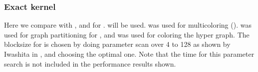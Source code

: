 

\subsubsection{Exact kernel}
Here we compare  \RACE with \ABMC, \MC and \MKL for \SymmSpmv.  will be used. \COLPACK \cite{COLPACK} %
was used for multicoloring (\MC). \METIS \cite{METIS}  was used for graph partitioning for \ABMC, and \COLPACK was used for coloring the hyper graph. The blocksize for \ABMC is chosen by doing parameter scan over 4 to 128 as shown by Iwashita \etal in \cite{ABMC}, and choosing the optimal one. Note that the time for this parameter search is not included in the performance results shown. 



